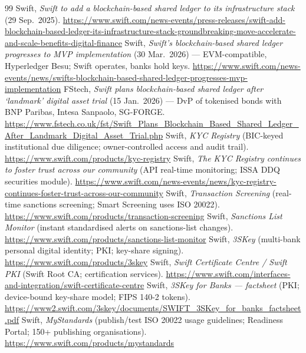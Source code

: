 \documentclass[11pt,a4paper]{article}
\begin{document}
\begin{thebibliography}{99}
\small
{} Swift, \emph{Swift to add a blockchain-based shared ledger to its infrastructure stack} (29 Sep.\ 2025). \url{https://www.swift.com/news-events/press-releases/swift-add-blockchain-based-ledger-its-infrastructure-stack-groundbreaking-move-accelerate-and-scale-benefits-digital-finance}
 Swift, \emph{Swift's blockchain-based shared ledger progresses to MVP implementation} (30 Mar.\ 2026) --- EVM-compatible, Hyperledger Besu; Swift operates, banks hold keys. \url{https://www.swift.com/news-events/news/swifts-blockchain-based-shared-ledger-progresses-mvp-implementation}
 FStech, \emph{Swift plans blockchain-based shared ledger after `landmark' digital asset trial} (15 Jan.\ 2026) --- DvP of tokenised bonds with BNP Paribas, Intesa Sanpaolo, SG-FORGE. \url{https://www.fstech.co.uk/fst/Swift_Plans_Blockchain_Based_Shared_Ledger_After_Landmark_Digital_Asset_Trial.php}
 Swift, \emph{KYC Registry} (BIC-keyed institutional due diligence; owner-controlled access and audit trail). \url{https://www.swift.com/products/kyc-registry}
 Swift, \emph{The KYC Registry continues to foster trust across our community} (API real-time monitoring; ISSA DDQ securities module). \url{https://www.swift.com/news-events/news/kyc-registry-continues-foster-trust-across-our-community}
 Swift, \emph{Transaction Screening} (real-time sanctions screening; Smart Screening uses ISO 20022). \url{https://www.swift.com/products/transaction-screening}
 Swift, \emph{Sanctions List Monitor} (instant standardised alerts on sanctions-list changes). \url{https://www.swift.com/products/sanctions-list-monitor}
 Swift, \emph{3SKey} (multi-bank personal digital identity; PKI; key-share signing). \url{https://www.swift.com/products/3skey}
 Swift, \emph{Swift Certificate Centre / Swift PKI} (Swift Root CA; certification services). \url{https://www.swift.com/interfaces-and-integration/swift-certificate-centre}
 Swift, \emph{3SKey for Banks --- factsheet} (PKI; device-bound key-share model; FIPS 140-2 tokens). \url{https://www2.swift.com/3skey/documents/SWIFT_3SKey_for_banks_factsheet.pdf}
 Swift, \emph{MyStandards} (publish/test ISO 20022 usage guidelines; Readiness Portal; 150+ publishing organisations). \url{https://www.swift.com/products/mystandards}

\end{thebibliography}
\end{document}

